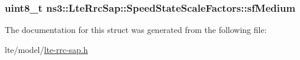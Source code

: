 \subsubsection[{\texorpdfstring{sf\+Medium}{sfMedium}}]{\setlength{\rightskip}{0pt plus 5cm}uint8\+\_\+t ns3\+::\+Lte\+Rrc\+Sap\+::\+Speed\+State\+Scale\+Factors\+::sf\+Medium}\hypertarget{structns3_1_1LteRrcSap_1_1SpeedStateScaleFactors_a9445d6c4330b55f68493b270cfd4d502}{}\label{structns3_1_1LteRrcSap_1_1SpeedStateScaleFactors_a9445d6c4330b55f68493b270cfd4d502}


The documentation for this struct was generated from the following file\+:\begin{DoxyCompactItemize}
\item 
lte/model/\hyperlink{lte-rrc-sap_8h}{lte-\/rrc-\/sap.\+h}\end{DoxyCompactItemize}
